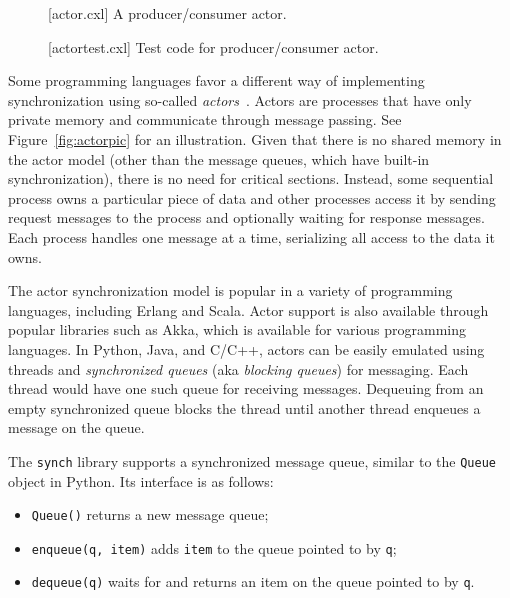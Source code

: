 \documentclass{report}
\newenvironment{code}{
\tcolorbox
}{
\endtcolorbox
}
\begin{document}
\begin{figure}
\begin{code}
\end{code}
\caption{[actor.cxl] A producer/consumer actor.}
\label{fig:actor}
\end{figure}

\begin{figure}
\begin{code}
\end{code}
\caption{[actortest.cxl] Test code for producer/consumer actor.}
\label{fig:actortest}
\end{figure}

Some programming languages favor a different way of implementing
synchronization using so-called \emph{actors}~\cite{HBS73}.  Actors are
processes that have only private memory and communicate through message passing.
See Figure~\ref{fig:actorpic} for an illustration.
Given that there is no shared memory in the actor model (other than the message
queues, which have built-in synchronization), there is no need
for critical sections.  Instead, some sequential process owns a particular
piece of data and other processes access it by sending request messages
to the process and optionally waiting for response messages.  Each process
handles one message at a time, serializing all access to the data it owns.

The actor synchronization model is popular in a variety of programming
languages, including Erlang and Scala.  Actor support is also available
through popular libraries such as Akka, which is available for various
programming languages.  In Python, Java, and C/C++,
actors can be easily emulated using threads and \emph{synchronized queues}
(aka \emph{blocking queues})
for messaging.
Each thread would have one such queue for receiving messages.
Dequeuing from an empty synchronized queue blocks the thread until
another thread enqueues a message on the queue.

The \texttt{synch} library supports a synchronized message queue,
similar to the \texttt{Queue} object in Python.
Its interface is as follows:
\begin{itemize}
\item \texttt{Queue()} returns a new message queue;
\item \texttt{enqueue(q, item)} adds \texttt{item} to the queue pointed to by \texttt{q};
\item \texttt{dequeue(q)} waits for and returns an item on the queue pointed to by \texttt{q}.
\end{itemize}
\end{document}
